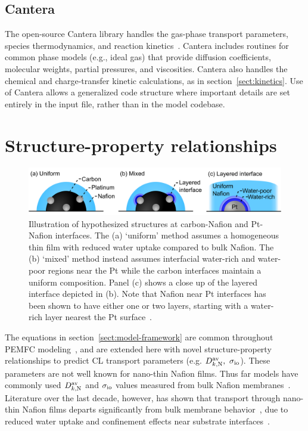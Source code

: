 \documentclass[final,3p,times,twocolumn]{elsarticle}    %
\newcommand{\crr}[1]{\color{red} #1 \color{black}}
\begin{document}
\subsection{Cantera}
The open-source Cantera library handles the gas-phase transport parameters, species thermodynamics, and reaction kinetics~\cite{bib:cantera_2017}. Cantera includes routines for common phase models (e.g., ideal gas) that provide diffusion coefficients, molecular weights, partial pressures, and viscosities. Cantera also handles the chemical and charge-transfer kinetic calculations, as in section~\ref{sect:kinetics}. Use of Cantera allows a generalized code structure where important details are set entirely in the input file, rather than in the model codebase.


\section{Structure-property relationships}
\label{sect:struct-prop-relationships}

\begin{figure}[htb!]
    \centering
    \includegraphics[width=5.94in]{figures/updated-struct-prop-models-5_94in.png}
    \caption{Illustration of hypothesized structures at carbon-Nafion and Pt-Nafion interfaces. The (a) `uniform' method assumes a homogeneous thin film with reduced water uptake compared to bulk Nafion. The (b) `mixed' method instead assumes interfacial water-rich and water-poor regions near the Pt while the carbon interfaces maintain a uniform composition. \crr{Panel (c) shows a close up of the layered interface depicted in (b). Note that Nafion near Pt interfaces has been shown to have either one or two layers, starting with a water-rich layer nearest the Pt surface~\cite{bib:wood_2009, bib:shrivastava_2018}.}}
    \label{fig:struct-models}
\end{figure}

The equations in section~\ref{sect:model-framework} are common throughout PEMFC modeling~\cite{bib:weber_2004, bib:weber_2014, bib:arif_2020}, and are extended here with novel structure-property relationships to predict CL transport parameters (e.g. $D_{k,\rm N}^{\rm av}, \ \sigma_{\rm io}$). These parameters are not well known for nano-thin Nafion films. Thus far models have commonly used $D_{k,\rm N}^{\rm av}$ and $\sigma_{\rm io}$ values measured from bulk Nafion membranes~\cite{bib:springer_1991, bib:weber_2004, bib:chu_2003, bib:ismail_2017, bib:aghighi_2017}. Literature over the last decade, however, has shown that transport through nano-thin Nafion films departs significantly from bulk membrane behavior~\cite{bib:decaluwe_2018, bib:paul_mccreery_2014, bib:paul_2014}, due to reduced water uptake and confinement effects near substrate interfaces~\cite{bib:dura_2009, bib:decaluwe_2018, bib:kusoglu_2012, bib:kusoglu_2017}.
\end{document}
